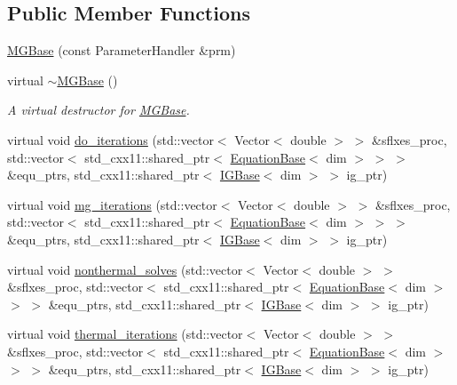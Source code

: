 \subsection*{Public Member Functions}
\begin{DoxyCompactItemize}
\item 
\hyperlink{class_m_g_base_ad938184229e773a339be9ba1fc487aa1}{M\+G\+Base} (const Parameter\+Handler \&prm)
\item 
virtual \hyperlink{class_m_g_base_a011e50e1caf44cfa3335b95d161ba14d}{$\sim$\+M\+G\+Base} ()
\begin{DoxyCompactList}\small\item\em A virtual destructor for \hyperlink{class_m_g_base}{M\+G\+Base}. \end{DoxyCompactList}\item 
virtual void \hyperlink{class_m_g_base_a3586c47d901608bc42792c6de456b1cb}{do\+\_\+iterations} (std\+::vector$<$ Vector$<$ double $>$ $>$ \&sflxes\+\_\+proc, std\+::vector$<$ std\+\_\+cxx11\+::shared\+\_\+ptr$<$ \hyperlink{class_equation_base}{Equation\+Base}$<$ dim $>$ $>$ $>$ \&equ\+\_\+ptrs, std\+\_\+cxx11\+::shared\+\_\+ptr$<$ \hyperlink{class_i_g_base}{I\+G\+Base}$<$ dim $>$ $>$ ig\+\_\+ptr)
\item 
virtual void \hyperlink{class_m_g_base_a6ae523b6ee434588d85f8370413d0de9}{mg\+\_\+iterations} (std\+::vector$<$ Vector$<$ double $>$ $>$ \&sflxes\+\_\+proc, std\+::vector$<$ std\+\_\+cxx11\+::shared\+\_\+ptr$<$ \hyperlink{class_equation_base}{Equation\+Base}$<$ dim $>$ $>$ $>$ \&equ\+\_\+ptrs, std\+\_\+cxx11\+::shared\+\_\+ptr$<$ \hyperlink{class_i_g_base}{I\+G\+Base}$<$ dim $>$ $>$ ig\+\_\+ptr)
\item 
virtual void \hyperlink{class_m_g_base_a55ba9bef3616dd5eab9e3986f6e8e311}{nonthermal\+\_\+solves} (std\+::vector$<$ Vector$<$ double $>$ $>$ \&sflxes\+\_\+proc, std\+::vector$<$ std\+\_\+cxx11\+::shared\+\_\+ptr$<$ \hyperlink{class_equation_base}{Equation\+Base}$<$ dim $>$ $>$ $>$ \&equ\+\_\+ptrs, std\+\_\+cxx11\+::shared\+\_\+ptr$<$ \hyperlink{class_i_g_base}{I\+G\+Base}$<$ dim $>$ $>$ ig\+\_\+ptr)
\item 
virtual void \hyperlink{class_m_g_base_a9d3c6ab6e58f0119badb30feedb2ac4d}{thermal\+\_\+iterations} (std\+::vector$<$ Vector$<$ double $>$ $>$ \&sflxes\+\_\+proc, std\+::vector$<$ std\+\_\+cxx11\+::shared\+\_\+ptr$<$ \hyperlink{class_equation_base}{Equation\+Base}$<$ dim $>$ $>$ $>$ \&equ\+\_\+ptrs, std\+\_\+cxx11\+::shared\+\_\+ptr$<$ \hyperlink{class_i_g_base}{I\+G\+Base}$<$ dim $>$ $>$ ig\+\_\+ptr)
\end{DoxyCompactItemize}
